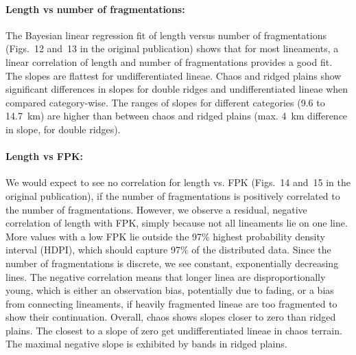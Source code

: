 \paragraph{Length vs number of fragmentations:} 
The Bayesian linear regression fit of length versus number of fragmentations (Figs.~12 and~13 in the original publication) shows that for most lineaments, a linear correlation of length and number of fragmentations provides a good fit. The slopes are flattest for undifferentiated lineae. Chaos and ridged plains show significant differences in slopes for double ridges and undifferentiated lineae when compared category-wise. The ranges of slopes for different categories (9.6 to \qty{14.7}{\km}) are higher than between chaos and ridged plains (max. \qty{4}{\km} difference in slope, for double ridges).

\paragraph{Length vs FPK:} 
We would expect to see no correlation for length vs. FPK (Figs.~14 and~15 in the original publication), if the number of fragmentations is positively correlated to the number of fragmentations. However, we observe a residual, negative correlation of length with FPK, simply because not all lineaments lie on one line. More values with a low FPK lie outside the 97\% highest probability density interval (HDPI), which should capture 97\% of the distributed data. Since the number of fragmentations is discrete, we see constant, exponentially decreasing lines. The negative correlation means that longer linea are disproportionally young, which is either an observation bias, potentially due to fading, or a bias from connecting lineaments, if heavily fragmented lineae are too fragmented to show their continuation. Overall, chaos shows slopes closer to zero than ridged plains. The closest to a slope of zero get undifferentiated lineae in chaos terrain. The maximal negative slope is exhibited by bands in ridged plains.

